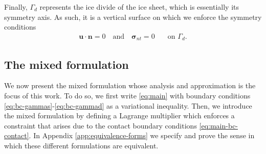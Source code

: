 \documentclass[onefignum,onetabnum]{siamart190516}
\newcommand{\bn}{\boldsymbol{n}}
\newcommand{\bu}{\boldsymbol{u}}
\newcommand{\bsigma}{\boldsymbol{\sigma}}
\begin{document}
Finally, $\Gamma_d$ represents the ice divide of the ice sheet, which is essentially its symmetry axis. As such, it is a vertical surface on which we enforce the symmetry conditions
%
\begin{align}\label{eq:bc-gammad}
	\bu\cdot\bn = 0 \quad \text{and} \quad \bsigma_{nt} = 0 \quad & \text{on $\Gamma_d$}.
\end{align}
%


\subsection{The mixed formulation}

We now present the mixed formulation whose analysis and approximation is the focus of this work. To do so, we first write \eqref{eq:main} with boundary conditions \eqref{eq:bc-gammas}-\eqref{eq:bc-gammad} as a variational inequality. Then, we introduce the mixed formulation by defining a Lagrange multiplier which enforces a constraint that arises due to the contact boundary conditions \eqref{eq:main-bc-contact}. In Appendix \ref{app:equivalence-forms} we specify and prove the sense in which these different formulations are equivalent.
\end{document}

